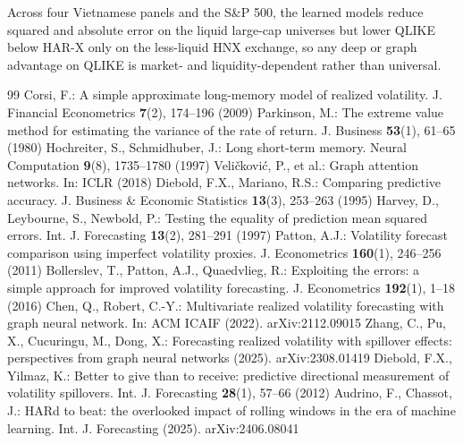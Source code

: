 \documentclass[runningheads]{llncs}
\begin{document}
Across four
Vietnamese panels and the S\&P 500, the learned models reduce squared and absolute error on the liquid
large-cap universes but lower QLIKE below HAR-X only on the less-liquid HNX exchange, so any deep or graph
advantage on QLIKE is market- and liquidity-dependent rather than universal.

\begin{thebibliography}{99}
 Corsi, F.: A simple approximate long-memory model of realized volatility. J. Financial Econometrics \textbf{7}(2), 174--196 (2009)
 Parkinson, M.: The extreme value method for estimating the variance of the rate of return. J. Business \textbf{53}(1), 61--65 (1980)
 Hochreiter, S., Schmidhuber, J.: Long short-term memory. Neural Computation \textbf{9}(8), 1735--1780 (1997)
 Veli\v{c}kovi\'c, P., et al.: Graph attention networks. In: ICLR (2018)
 Diebold, F.X., Mariano, R.S.: Comparing predictive accuracy. J. Business \& Economic Statistics \textbf{13}(3), 253--263 (1995)
 Harvey, D., Leybourne, S., Newbold, P.: Testing the equality of prediction mean squared errors. Int. J. Forecasting \textbf{13}(2), 281--291 (1997)
 Patton, A.J.: Volatility forecast comparison using imperfect volatility proxies. J. Econometrics \textbf{160}(1), 246--256 (2011)
 Bollerslev, T., Patton, A.J., Quaedvlieg, R.: Exploiting the errors: a simple approach for improved volatility forecasting. J. Econometrics \textbf{192}(1), 1--18 (2016)
 Chen, Q., Robert, C.-Y.: Multivariate realized volatility forecasting with graph neural network. In: ACM ICAIF (2022). arXiv:2112.09015
 Zhang, C., Pu, X., Cucuringu, M., Dong, X.: Forecasting realized volatility with spillover effects: perspectives from graph neural networks (2025). arXiv:2308.01419
 Diebold, F.X., Yilmaz, K.: Better to give than to receive: predictive directional measurement of volatility spillovers. Int. J. Forecasting \textbf{28}(1), 57--66 (2012)
 Audrino, F., Chassot, J.: HARd to beat: the overlooked impact of rolling windows in the era of machine learning. Int. J. Forecasting (2025). arXiv:2406.08041
\end{thebibliography}
\end{document}
